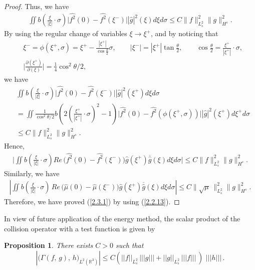 \documentclass{amsart}[12pt, article]
\newtheorem{prop}[theo]{Proposition}
\begin{document}
\begin{proof}
Thus, we have
\begin{align*}
\iint b\left(\frac{\xi}{|\xi|}\cdot \sigma \right)
\big|\widehat{f^2} (0) - \widehat{f^2} (\xi^-) \big| |{\hat g}|^2 (\xi ) d\xi d\sigma\leq
C\|f\|^2_{L^2_s}\|g\|^2_{H^s}.
\end{align*}
By using the regular change of variables $\xi\rightarrow \xi^+$,
and by noticing that
 \begin{eqnarray*}
 &\xi^-=\phi(\xi^+,\sigma)=\xi^+-\frac{|\xi^+|}{\cos\frac \theta 2}\sigma,\qquad
 |\xi^-|=|\xi^+|\tan\frac\theta 2,\qquad \cos\frac\theta 2=\frac{\xi^+}{|\xi^+|}\cdot\sigma,
 \\&
\Big|\frac {\partial (\xi^+)}{\partial ( \xi)}\Big| = \frac 14 \cos^2\theta/2,
 \end{eqnarray*}
  we have
\begin{align*}
&\iint b\left(\frac{\xi}{|\xi|}\cdot \sigma \right)
\big|\widehat{f^2} (0) - \widehat{f^2} (\xi^-) \big| |{\hat g}|^2 (\xi^+ ) d\xi d\sigma\\
&=\iint \frac{1}{\cos^2\theta/2}b\left(2(\frac{\xi^+}{|\xi^+|}\cdot \sigma)^2-1 \right)
\big|\widehat{f^2} (0) - \widehat{f^2} (\phi(\xi^+,\sigma)) \big| |{\hat g}|^2 (\xi^+ )  d\xi^+ d\sigma\\
&\leq
C\|f\|^2_{L^2_s}\|g\|^2_{H^s}.
\end{align*}
Hence,
\begin{align*}
\big|\iint b
\left(\frac{\xi}{|\xi|}\cdot \sigma \right) Re\, \Big(\widehat{f^2}
(0) - \widehat{f^2} (\xi^-) \Big) \hat g (\xi^+ ) \overline{\hat g}
(\xi ) d\xi d\sigma\big|
\leq
C\|f\|^2_{L^2_s}\|g\|^2_{H^s}.
\end{align*}
Similarly, we have
\begin{align*}
\left| \iint b \left(\frac{\xi}{|\xi|}\cdot \sigma \right)\,Re\,
\Big(\hat \mu (0) - \hat \mu (\xi^-) \Big) \hat g (\xi^+ )
\overline{\hat g} (\xi ) d\xi d\sigma \right|\leq
C\|\sqrt{\mu}\,\|^2_{L^2_s}\|g\|^2_{H^s}.
\end{align*}
Therefore, we have proved (\ref{2.3.1}) by using (\ref{2.2.13}).
\end{proof}

In view of future application of the energy method, the scalar product of the collision operator with a test function is given by

\begin{prop}\label{prop2.3.1}
 There exists
$C>0$ such that
\begin{equation*}\label{2.3.2}
\left|\Big(\Gamma (f,\, g) ,\,  h\Big)_{L^2({{{\mathbb R}}}^3)} \right| \leq
C\left(|| f ||_{L^2_s}\, ||| g||| + ||
g||_{L^2_s}\,||| f|||\, \right)\,\, |||
h|||\, .
\end{equation*}
\end{prop}
\end{document}
